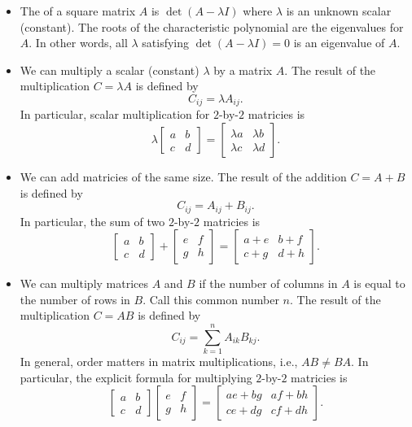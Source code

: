 \documentclass[../main.tex]{subfiles}
\begin{document}
\begin{itemize}
  \item The  of a square matrix \(A\) is \(\det(A - \lambda I)\) where \(\lambda\) is an unknown scalar (constant).  The roots of the characteristic polynomial are the eigenvalues for \(A\).  In other words, all \(\lambda\) satisfying \(\det(A - \lambda I) = 0\) is an eigenvalue of \(A\).

  \item We can multiply a scalar (constant) \(\lambda\) by a matrix \(A\). The result of the multiplication \(C = \lambda A\) is defined by \[C_{ij} = \lambda A_{ij}.\]  In particular, scalar multiplication for \(2\)-by-\(2\) matricies is
\[
  \lambda 
  \begin{bmatrix}
    a & b \\
    c & d
  \end{bmatrix}
  = 
  \begin{bmatrix}
    \lambda a & \lambda b \\
    \lambda c & \lambda d
  \end{bmatrix}.
\]

  \item We can add matricies of the same size. The result of the addition \(C = A + B\) is defined by \[C_{ij} = A_{ij} + B_{ij}.\]  In particular, the sum of two \(2\)-by-\(2\) matricies is
\[
  \begin{bmatrix}
    a & b \\
    c & d
  \end{bmatrix}
  +
  \begin{bmatrix}
    e & f \\
    g & h
  \end{bmatrix}
  =
  \begin{bmatrix}
    a + e & b + f \\
    c + g & d + h
  \end{bmatrix}.
\]

  \item We can multiply matrices \(A\) and \(B\) if the number of columns in \(A\) is equal to the number of rows in \(B\). Call this common number \(n\). The result of the multiplication \(C = AB\) is defined by 
\[
  C_{ij} = \sum_{k=1}^{n} A_{ik} B_{kj}.
\]
In general, order matters in matrix multiplications, i.e., \(AB \ne BA\).  In particular, the explicit formula for multiplying \(2\)-by-\(2\) matricies is
\[
  \begin{bmatrix}
    a & b \\
    c & d
  \end{bmatrix}
  \begin{bmatrix}
    e & f \\
    g & h
  \end{bmatrix}
  =
  \begin{bmatrix}
    ae + bg & af + bh \\
    ce + dg & cf + dh
  \end{bmatrix}.
\]
\end{itemize}
\clearpage
\end{document}
